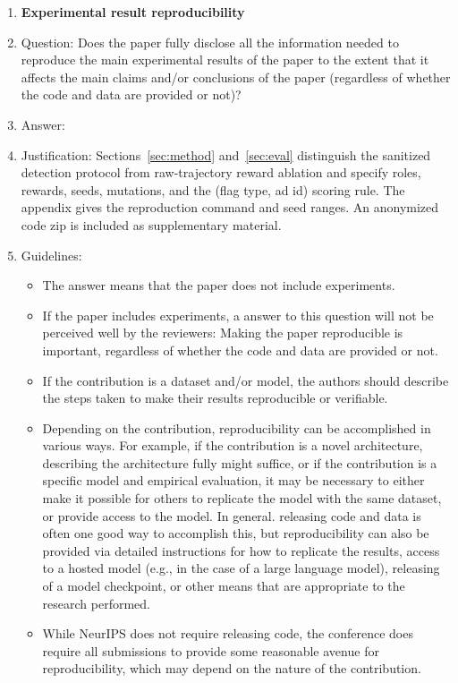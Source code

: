 \begin{enumerate}
\item {\bf Experimental result reproducibility}
    \item[] Question: Does the paper fully disclose all the information needed to reproduce the main experimental results of the paper to the extent that it affects the main claims and/or conclusions of the paper (regardless of whether the code and data are provided or not)?
    \item[] Answer: \answerYes{}
    \item[] Justification: Sections~\ref{sec:method} and~\ref{sec:eval} distinguish the sanitized detection protocol from raw-trajectory reward ablation and specify roles, rewards, seeds, mutations, and the (flag type, ad id) scoring rule. The appendix gives the reproduction command and seed ranges. An anonymized code zip is included as supplementary material.
    \item[] Guidelines:
    \begin{itemize}
        \item The answer \answerNA{} means that the paper does not include experiments.
        \item If the paper includes experiments, a \answerNo{} answer to this question will not be perceived well by the reviewers: Making the paper reproducible is important, regardless of whether the code and data are provided or not.
        \item If the contribution is a dataset and\slash or model, the authors should describe the steps taken to make their results reproducible or verifiable.
        \item Depending on the contribution, reproducibility can be accomplished in various ways. For example, if the contribution is a novel architecture, describing the architecture fully might suffice, or if the contribution is a specific model and empirical evaluation, it may be necessary to either make it possible for others to replicate the model with the same dataset, or provide access to the model. In general. releasing code and data is often one good way to accomplish this, but reproducibility can also be provided via detailed instructions for how to replicate the results, access to a hosted model (e.g., in the case of a large language model), releasing of a model checkpoint, or other means that are appropriate to the research performed.
        \item While NeurIPS does not require releasing code, the conference does require all submissions to provide some reasonable avenue for reproducibility, which may depend on the nature of the contribution.
    \end{itemize}


\end{enumerate}
